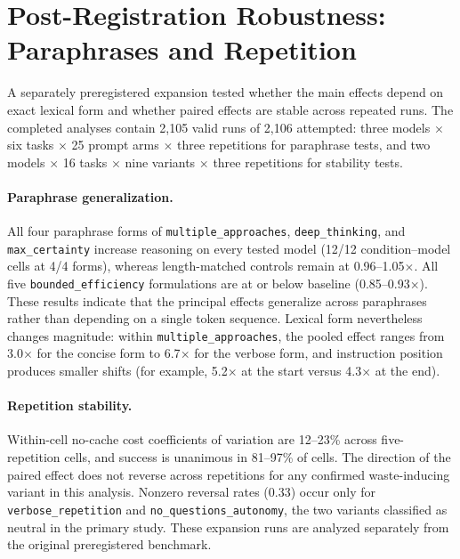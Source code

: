 \documentclass[11pt]{article}
\newcommand{\xd}{$\times$}
\begin{document}
\section{Post-Registration Robustness: Paraphrases and Repetition}
A separately preregistered expansion tested whether the main effects depend
on exact lexical form and whether paired effects are stable across repeated
runs. The completed analyses contain 2{,}105 valid runs of 2{,}106 attempted:
three models $\times$ six tasks $\times$ 25 prompt arms $\times$ three
repetitions for paraphrase tests, and two models $\times$ 16 tasks $\times$
nine variants $\times$ three repetitions for stability tests.

\paragraph{Paraphrase generalization.} All four paraphrase forms of
\texttt{multiple\_approaches}, \texttt{deep\_thinking}, and
\texttt{max\_certainty} increase reasoning on every tested model (12/12
condition--model cells at 4/4 forms), whereas length-matched controls remain
at 0.96--1.05\xd{}. All five \texttt{bounded\_efficiency} formulations are
at or below baseline (0.85--0.93\xd{}). These results indicate that the
principal effects generalize across paraphrases rather than depending on a
single token sequence. Lexical form nevertheless changes magnitude: within
\texttt{multiple\_approaches}, the pooled effect ranges from 3.0\xd{} for
the concise form to 6.7\xd{} for the verbose form, and instruction position
produces smaller shifts (for example, 5.2\xd{} at the start versus 4.3\xd{}
at the end).

\paragraph{Repetition stability.} Within-cell no-cache cost coefficients of
variation are 12--23\% across five-repetition cells, and success is unanimous
in 81--97\% of cells. The direction of the paired effect does not reverse
across repetitions for any confirmed waste-inducing variant in this
analysis. Nonzero reversal rates (0.33) occur only for
\texttt{verbose\_repetition} and \texttt{no\_questions\_autonomy}, the two
variants classified as neutral in the primary study. These expansion runs
are analyzed separately from the original preregistered benchmark.
\end{document}
